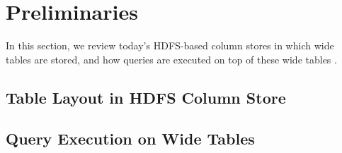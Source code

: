 \section{Preliminaries}

In this section, we review today's HDFS-based column stores in which wide tables are stored, and how queries are executed on top of these wide tables \cite{IEEEexample:IEEEwebsite}.

\subsection{Table Layout in HDFS Column Store}


\subsection{Query Execution on Wide Tables}

